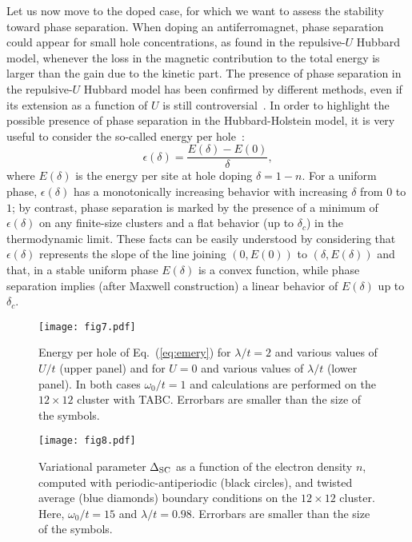 \documentclass[aps,superscriptaddress,amsmath,amssymb,twocolumn,showpacs,floatfix,english]{revtex4}
\begin{document}
Let us now move to the doped case, for which we want to assess the stability toward phase separation. When doping an antiferromagnet, 
phase separation could appear for small hole concentrations, as found in the repulsive-$U$ Hubbard model, whenever the loss in the 
magnetic contribution to the total energy is larger than the gain due to the kinetic part. The presence of phase separation in the 
repulsive-$U$ Hubbard model has been confirmed by different methods, even if its extension as a function of $U$ is still 
controversial~\cite{Macridin2006b,Aichhorn2007,Chang2008,Misawa2014,Sorella2015,Tocchio2016,Simkovic2017}. In order to highlight the 
possible presence of phase separation in the Hubbard-Holstein model, it is very useful to consider the so-called energy per 
hole~\cite{Emery1990}:
\begin{equation}\label{eq:emery}
\epsilon(\delta) = \frac{E(\delta)-E(0)}{\delta},
\end{equation}
where $E(\delta)$ is the energy per site at hole doping $\delta=1-n$. For a uniform phase, $\epsilon(\delta)$ has a monotonically 
increasing behavior with increasing $\delta$ from $0$ to $1$; by contrast, phase separation is marked by the presence of a minimum of
$\epsilon(\delta)$ on any finite-size clusters and a flat behavior (up to $\delta_c$) in the thermodynamic limit. These facts can be
easily understood by considering that $\epsilon(\delta)$ represents the slope of the line joining $(0,E(0))$ to $(\delta,E(\delta))$ and 
that, in a stable uniform phase $E(\delta)$ is a convex function, while phase separation implies (after Maxwell construction) a linear
behavior of $E(\delta)$ up to $\delta_c$.

\begin{figure}
\texttt{[image: fig7.pdf]}
\caption{\label{fig:phasesep1}
Energy per hole of Eq.~(\ref{eq:emery}) for $\lambda/t=2$ and various values of $U/t$ (upper panel) and for $U=0$ and various values of 
$\lambda/t$ (lower panel). In both cases $\omega_0/t=1$ and calculations are performed on the $12 \times 12$ cluster with TABC. 
Errorbars are smaller than the size of the symbols.}
\end{figure}

\begin{figure}
\texttt{[image: fig8.pdf]}
\caption{\label{fig:deltavsn}
Variational parameter $\Delta_{\rm SC}$ as a function of the electron density $n$, computed with periodic-antiperiodic (black circles), and 
twisted average (blue diamonds) boundary conditions on the $12 \times 12$ cluster. Here, $\omega_0/t=15$ and $\lambda/t=0.98$. Errorbars are 
smaller than the size of the symbols.}
\end{figure}
\end{document}
